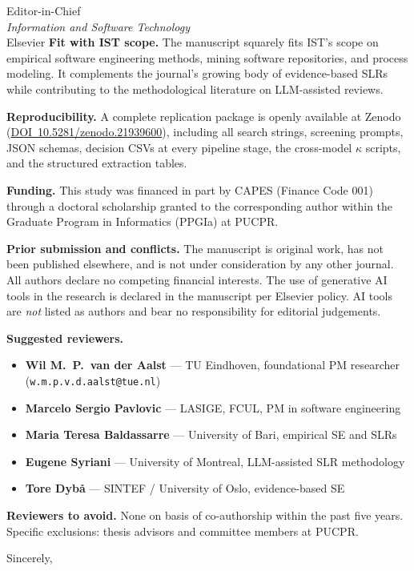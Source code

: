 \documentclass[11pt,a4paper]{letter}
\newcommand{\zenododoi}{10.5281/zenodo.21939600}
\newcommand{\zenododoiurl}{https://doi.org/\zenododoi}
\begin{document}
\begin{letter}{Editor-in-Chief \\ \emph{Information and Software Technology} \\ Elsevier}
\medskip\noindent\textbf{Fit with IST scope.}
The manuscript squarely fits IST's scope on empirical software engineering
methods, mining software repositories, and process modeling. It complements
the journal's growing body of evidence-based SLRs while contributing to
the methodological literature on LLM-assisted reviews.

\medskip\noindent\textbf{Reproducibility.}
A complete replication package is openly available at Zenodo
(\href{\zenododoiurl}{DOI~\zenododoi}),
including all search strings, screening prompts, JSON schemas, decision
CSVs at every pipeline stage, the cross-model $\kappa$ scripts, and the
structured extraction tables.

\medskip\noindent\textbf{Funding.}
This study was financed in part by CAPES (Finance Code 001) through a
doctoral scholarship granted to the corresponding author within the
Graduate Program in Informatics (PPGIa) at PUCPR.

\medskip\noindent\textbf{Prior submission and conflicts.}
The manuscript is original work, has not been published elsewhere, and is
not under consideration by any other journal. All authors declare no
competing financial interests. The use of generative AI tools in the
research is declared in the manuscript per Elsevier policy. AI tools are
\emph{not} listed as authors and bear no responsibility for editorial
judgements.

\medskip\noindent\textbf{Suggested reviewers.}
\begin{itemize}
\item \textbf{Wil M.\ P.\ van der Aalst} --- TU Eindhoven, foundational PM
      researcher (\texttt{w.m.p.v.d.aalst@tue.nl})
\item \textbf{Marcelo Sergio Pavlovic} --- LASIGE, FCUL, PM in software
      engineering
\item \textbf{Maria Teresa Baldassarre} --- University of Bari, empirical
      SE and SLRs
\item \textbf{Eugene Syriani} --- University of Montreal, LLM-assisted SLR
      methodology
\item \textbf{Tore Dyb{\aa}} --- SINTEF / University of Oslo, evidence-based
      SE
\end{itemize}

\medskip\noindent\textbf{Reviewers to avoid.}
None on basis of co-authorship within the past five years. Specific
exclusions: thesis advisors and committee members at PUCPR.

\closing{Sincerely,}

\end{letter}
\end{document}
